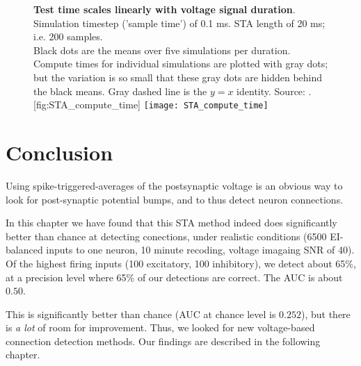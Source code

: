 \begin{figure}
    \begin{sidecaption}
        {\textbf{Test time scales linearly with voltage signal duration}.\\
        Simulation timestep ('sample time') of 0.1 ms. STA length of 20 ms; i.e. 200 samples.\\
        Black dots are the means over five simulations per duration. Compute times for individual simulations are plotted with gray dots; but the variation is so small that these gray dots are hidden behind the black means. Gray dashed line is the $y = x$ identity.  Source: .}
        [fig:STA_compute_time]
        \texttt{[image: STA\_compute\_time]}
    \end{sidecaption}
\end{figure}


\section{Conclusion}

Using spike-triggered-averages of the postsynaptic voltage is an obvious way to look for post-synaptic potential bumps, and to thus detect neuron connections.

In this chapter we have found that this STA method indeed does significantly better than chance at detecting conections, under realistic conditions (6500 EI-balanced inputs to one neuron, 10 minute recoding, voltage imagaing SNR of 40).
Of the highest firing inputs (100 excitatory, 100 inhibitory), we detect about 65\%, at a precision level where 65\% of our detections are correct. The AUC is about $0.50$.

This is significantly better than chance (AUC at chance level is $0.252$), but there is \emph{a lot} of room for improvement. Thus, we looked for new voltage-based connection detection methods. Our findings are described in the following chapter.

